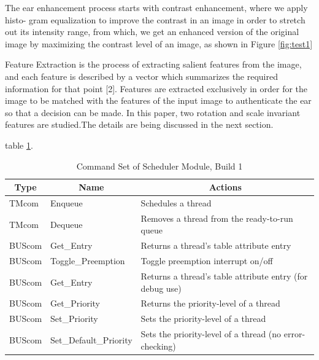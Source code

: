 The ear enhancement process starts with contrast enhancement, where we apply histo- gram equalization to improve the contrast in an image in order to stretch out its intensity range, from which, we get an enhanced version of the original image by maximizing the contrast level of an image, as shown in Figure \ref{fig:test1} 

Feature Extraction is the process of extracting salient features from the image, and each feature is described by a vector which summarizes the required information for that point [2]. Features are extracted exclusively in order for the image to be matched with the features of the input image to authenticate the ear so that a decision can be made. In this paper, two rotation and scale invariant features are studied.The details are being discussed in the next section.

 table \ref{tab:commands1}.

\begin{table}
\caption{\label{tab:commands1}Command Set of Scheduler Module, Build 1}
\centering
\begin{tabular}{llp{3.0in}}
\hline
\multicolumn{1}{c}{\textbf{Type}} &
\multicolumn{1}{c}{\textbf{Name}} &
\multicolumn{1}{c}{\textbf{Actions}} \\
\hline
TMcom	&	Enqueue				& Schedules a thread\\
TMcom	&	Dequeue				& Removes a thread from the ready-to-run queue	\\
BUScom	&	Get\_Entry     		& Returns a thread's table attribute entry		\\
BUScom	&	Toggle\_Preemption	& Toggle preemption interrupt on/off	\\
BUScom	&	Get\_Entry     		& Returns a thread's table attribute entry (for debug use)		\\
BUScom	&	Get\_Priority		& Returns the priority-level of a thread	\\
BUScom	&	Set\_Priority		& Sets the priority-level of a thread\\
BUScom	&	Set\_Default\_Priority		& Sets the priority-level of a thread (no error-checking)\\
\hline
\end{tabular}
\end{table}

